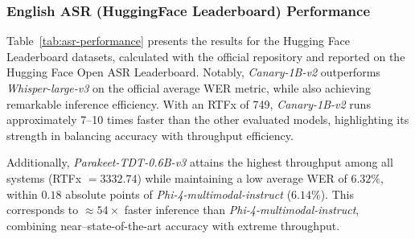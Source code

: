 \subsubsection{English ASR (HuggingFace Leaderboard) Performance}

Table~\ref{tab:asr-performance} presents the results for the Hugging Face Leaderboard datasets, calculated with the official repository and reported on the Hugging Face Open ASR Leaderboard. Notably, \emph{Canary-1B-v2} outperforms \emph{Whisper-large-v3} on the official average WER metric, while also achieving remarkable inference efficiency. With an RTFx of 749, \emph{Canary-1B-v2} runs approximately 7--10 times faster than the other evaluated models, highlighting its strength in balancing accuracy with throughput efficiency.

Additionally, \emph{Parakeet-TDT-0.6B-v3} attains the highest throughput among all systems (RTFx \(=3332.74\)) while maintaining a low average WER of \(6.32\%\), within \(0.18\) absolute points of \emph{Phi-4-multimodal-instruct} (\(6.14\%\)). This corresponds to \(\approx 54\times\) faster inference than \emph{Phi-4-multimodal-instruct}, combining near–state-of-the-art accuracy with extreme throughput.

\begin{table}[ht]
\centering
{}
\vspace{10pt}
\caption{ASR performance (WER \%) and inference efficiency (RTFx) on Hugging Face OpenASR Leaderboard benchmarks.}
\label{tab:asr-performance}
\end{table}


